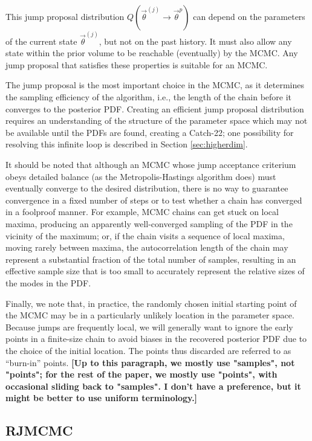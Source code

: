 \documentclass{iopart}
\newcommand{\vtheta}{\vec{\theta}}
\newcommand{\ilya}[1]{{\color{red} \bf #1}}
\begin{document}
This jump proposal distribution $Q(\vtheta^{(j)} \to \vtheta^p)$ can
depend on the parameters of the current state $\vtheta^{(j)}$, but not
on the past history.  It must also allow any state within the prior
volume to be reachable (eventually) by the MCMC.  Any jump proposal
that satisfies these properties is suitable for an MCMC.

The jump proposal is the most important choice in the MCMC, as it
determines the sampling efficiency of the algorithm, i.e., the length
of the chain before it converges to the posterior PDF.  Creating an
efficient jump proposal distribution requires an understanding of the
structure of the parameter space which may not be available until the
PDFs are found, creating a Catch-22; one possibility for resolving
this infinite loop is described in Section \ref{sec:higherdim}.

It should be noted that although an MCMC whose jump acceptance
criterium obeys detailed balance (as the Metropolis-Hastings algorithm
does) must eventually converge to the desired distribution, there is
no way to guarantee convergence in a fixed number of steps or to test
whether a chain has converged in a foolproof manner.  For example,
MCMC chains can get stuck on local maxima, producing an apparently
well-converged sampling of the PDF in the vicinity of the maximum; or,
if the chain visits a sequence of local maxima, moving rarely between
maxima, the autocorrelation length of the chain may represent a
substantial fraction of the total number of samples, resulting in an
effective sample size that is too small to accurately represent the
relative sizes of the modes in the PDF.

Finally, we note that, in practice, the randomly chosen initial
starting point of the MCMC may be in a particularly unlikely location
in the parameter space.  Because jumps are frequently local, we will
generally want to ignore the early points in a finite-size chain to
avoid biases in the recovered posterior PDF due to the choice of the
initial location.  The points thus discarded are referred to as
``burn-in'' points. \ilya{[Up to this paragraph, we mostly use "samples", not "points"; for the rest of the paper, we mostly use "points", with occasional sliding back to "samples".  I don't have a preference, but it might be better to use uniform terminology.]}

\subsection{RJMCMC}\label{RJMCMC}
\end{document}
